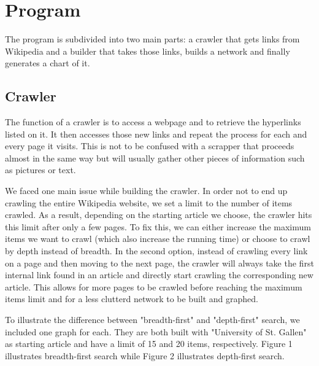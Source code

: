 \documentclass[10pt]{article}
\begin{document}
\section{Program}
The program is subdivided into two main parts: a crawler that gets links from Wikipedia and a builder that takes those links, builds a network and finally generates a chart of it.

	\subsection{Crawler}
	The function of a crawler is to access a webpage and to retrieve the hyperlinks listed on it. It then accesses those new links and repeat the process for each and every page it 	
	visits. This is not to be confused with a scrapper that proceeds almost in the same way but will usually gather other pieces of information such as pictures or text.
	\par \noindent
	We faced one main issue while building the crawler. In order not to end up crawling the entire Wikipedia website, we set a limit to the number of items crawled. As a result, 	
	depending on the starting article we choose, the crawler hits this limit after only a few pages. To fix this, we can either increase the maximum items we want to crawl (which also 
	increase the running time) or choose to crawl by depth instead of breadth. In the second option, instead of crawling every link on a page and then moving to the next page, the 
	crawler will always take the first internal link found in an article and directly start crawling the corresponding new article. This allows for more pages to be crawled before reaching 
	the maximum items limit and for a less clutterd network to be built and graphed.\par \noindent

	To illustrate the difference between "breadth-first" and "depth-first" search, we included one graph for each. They are both built with "University of St. Gallen" as starting article and have a limit of 15 and 20 items, respectively. Figure 1 illustrates breadth-first search while Figure 2 illustrates depth-first search.\\
	
\end{document}
